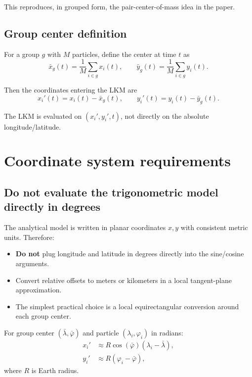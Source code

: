 \documentclass[11pt,a4paper]{article}
\begin{document}
	This reproduces, in grouped form, the pair-center-of-mass idea in the paper.
	
	\subsection{Group center definition}
	
	For a group $g$ with $M$ particles, define the center at time $t$ as
	\begin{equation}
		\bar{x}_g(t) = \frac{1}{M}\sum_{i\in g} x_i(t), \qquad
		\bar{y}_g(t) = \frac{1}{M}\sum_{i\in g} y_i(t).
	\end{equation}
	
	Then the coordinates entering the LKM are
	\begin{equation}
		x_i'(t) = x_i(t)-\bar{x}_g(t), \qquad
		y_i'(t) = y_i(t)-\bar{y}_g(t).
	\end{equation}
	
	The LKM is evaluated on $(x_i', y_i', t)$, not directly on the absolute longitude/latitude.
	
	\section{Coordinate system requirements}
	
	\subsection{Do not evaluate the trigonometric model directly in degrees}
	
	The analytical model is written in planar coordinates $x,y$ with consistent metric units. Therefore:
	\begin{itemize}[leftmargin=1.5em]
		\item \textbf{Do not} plug longitude and latitude in degrees directly into the sine/cosine arguments.
		\item Convert relative offsets to meters or kilometers in a local tangent-plane approximation.
		\item The simplest practical choice is a local equirectangular conversion around each group center.
	\end{itemize}
	
	For group center $(\bar\lambda, \bar\varphi)$ and particle $(\lambda_i, \varphi_i)$ in radians:
	\begin{align}
		x_i' &\approx R \cos(\bar\varphi) (\lambda_i - \bar\lambda), \\
		y_i' &\approx R (\varphi_i - \bar\varphi),
	\end{align}
	where $R$ is Earth radius.
	
\end{document}
